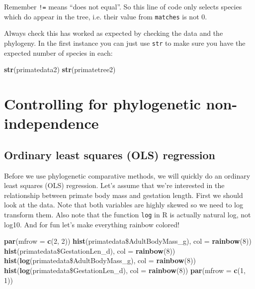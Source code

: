 \documentclass[12pt]{article}
\newcommand{\KeywordTok}[1]{\textcolor[rgb]{0.13,0.29,0.53}{\textbf{{#1}}}}
\newcommand{\DataTypeTok}[1]{\textcolor[rgb]{0.13,0.29,0.53}{{#1}}}
\newcommand{\DecValTok}[1]{\textcolor[rgb]{0.00,0.00,0.81}{{#1}}}
\newcommand{\NormalTok}[1]{{#1}}
\begin{document}
Remember \texttt{!=} means ``does not equal''. So this line of code only selects species which do appear in the tree, i.e. their value from \texttt{matches} is not 0. 

Always check this has worked as expected by checking the data and the phylogeny. In the first instance you can just use \texttt{str} to make sure you have the expected number of species in each:

\begin{snugshade}
\begin{Highlighting}[]
\KeywordTok{str}\NormalTok{(primatedata2)}
\KeywordTok{str}\NormalTok{(primatetree2)}
\end{Highlighting}
\end{snugshade}

\section{Controlling for phylogenetic non-independence}

\subsection{Ordinary least squares (OLS) regression}
Before we use phylogenetic comparative methods, we will quickly do an ordinary least squares (OLS) regression. Let’s assume that we’re interested in the relationship between primate body mass and gestation length. First we should look at the data. Note that both variables are highly skewed so we need to log transform them. Also note that the function \texttt{log} in R is actually natural log, not log10. And for fun let's make everything rainbow colored!

\begin{snugshade}
\begin{Highlighting}[]
\KeywordTok{par}\NormalTok{(}\DataTypeTok{mfrow =} \KeywordTok{c}\NormalTok{(}\DecValTok{2}\NormalTok{, }\DecValTok{2}\NormalTok{))}
\KeywordTok{hist}\NormalTok{(primatedata\$AdultBodyMass_g), }\DataTypeTok{col =} \KeywordTok{rainbow}\NormalTok{(}\DecValTok{8}\NormalTok{))}
\KeywordTok{hist}\NormalTok{(primatedata\$GestationLen_d), }\DataTypeTok{col =} \KeywordTok{rainbow}\NormalTok{(}\DecValTok{8}\NormalTok{))}
\KeywordTok{hist}\NormalTok{(}\KeywordTok{log}\NormalTok{(primatedata\$AdultBodyMass_g), }\DataTypeTok{col =} \KeywordTok{rainbow}\NormalTok{(}\DecValTok{8}\NormalTok{))}
\KeywordTok{hist}\NormalTok{(}\KeywordTok{log}\NormalTok{(primatedata\$GestationLen_d), }\DataTypeTok{col =} \KeywordTok{rainbow}\NormalTok{(}\DecValTok{8}\NormalTok{))}
\KeywordTok{par}\NormalTok{(}\DataTypeTok{mfrow =} \KeywordTok{c}\NormalTok{(}\DecValTok{1}\NormalTok{, }\DecValTok{1}\NormalTok{))}
\end{Highlighting}
\end{snugshade}
\end{document}
